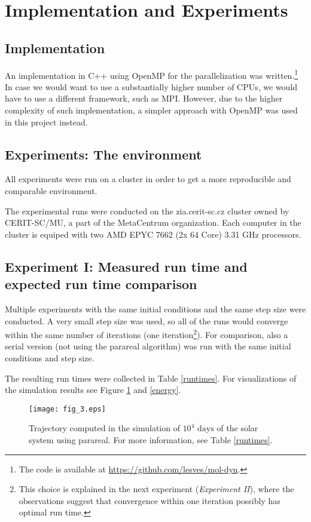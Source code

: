 \documentclass[conference]{IEEEtran}
\begin{document}
\section{Implementation and Experiments}

\subsection{Implementation}
An implementation in C++ using OpenMP for the parallelization was written.\footnote{The code is available at \url{https://github.com/lesves/mol-dyn}.} In case we would want to use a substantially higher number of CPUs, we would have to use a different framework, such as MPI. However, due to the higher complexity of such implementation, a simpler approach with OpenMP was used in this project instead.

\subsection{Experiments: The environment}
All experiments were run on a cluster in order to get a more reproducible and comparable environment. 

The experimental runs were conducted on the zia.cerit-sc.cz cluster owned by CERIT-SC/MU, a part of the MetaCentrum organization. Each computer in the cluster is equiped with two AMD EPYC 7662 (2x 64 Core) 3.31 GHz processors.

\subsection{Experiment I: Measured run time and expected run time comparison}

Multiple experiments with the same initial conditions and the same step size were conducted. A very small step size was used, so all of the runs would converge within the same number of iterations (one iteration\footnote{This choice is explained in the next experiment (\textit{Experiment II}), where the observations suggest that convergence within one iteration possibly has optimal run time.}). For comparison, also a serial version (not using the parareal algorithm) was run with the same initial conditions and step size.

The resulting run times were collected in Table \ref{runtimes}. For visualizations of the simulation results see Figure \ref{sim} and \ref{energy}.

\begin{figure}[htbp]
\centerline{\texttt{[image: fig\_3.eps]}}
\caption{Trajectory computed in the simulation of $10^4\text{ days}$ of the solar system using parareal. For more information, see Table \ref{runtimes}.}
\label{sim}
\end{figure}
\end{document}
